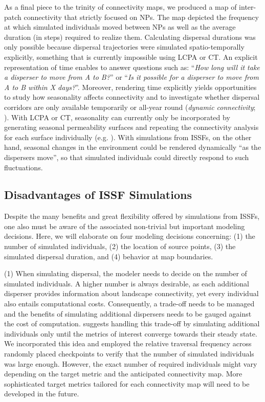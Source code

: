 \documentclass[abstract=on,10pt,a4paper,bibliography=totocnumbered]{article}
\begin{document}
As a final piece to the trinity of connectivity maps, we produced a map of
inter-patch connectivity that strictly focused on NPs. The map depicted the
frequency at which simulated individuals moved between NPs as well as the
average duration (in steps) required to realize them. Calculating dispersal
durations was only possible because dispersal trajectories were simulated
spatio-temporally explicitly, something that is currently impossible using LCPA
or CT. An explicit representation of time enables to answer questions such as:
``\textit{How long will it take a disperser to move from A to B?}'' or
``\textit{Is it possible for a disperser to move from A to B within X days?}''.
Moreover, rendering time explicitly yields opportunities to study how
seasonality affects connectivity and to investigate whether dispersal corridors
are only available temporarily or all-year round (\textit{dynamic connectivity};
\citealp{Zeller.2020}). With LCPA or CT, seasonality can currently only be
incorporated by generating seasonal permeability surfaces and repeating the
connectivity analysis for each surface individually (e.g. \citealp{Benz.2016,
Osipova.2019}). With simulations from ISSFs, on the other hand, seasonal changes
in the environment could be rendered dynamically ``as the dispersers move'', so
that simulated individuals could directly respond to such fluctuations.

\subsection{Disadvantages of ISSF Simulations}
Despite the many benefits and great flexibility offered by simulations from
ISSFs, one also must be aware of the associated non-trivial but important
modeling decisions. Here, we will elaborate on four modeling decisions
concerning: (1) the number of simulated individuals, (2) the location of source
points, (3) the simulated dispersal duration, and (4) behavior at map
boundaries.

(1) When simulating dispersal, the modeler needs to decide on the number of
simulated individuals. A higher number is always desirable, as each additional
disperser provides information about landscape connectivity, yet every
individual also entails computational costs. Consequently, a trade-off needs to
be managed and the benefits of simulating additional dispersers needs to be
gauged against the cost of computation. \cite{Signer.2017} suggests handling
this trade-off by simulating additional individuals only until the metrics of
interest converge towards their steady state. We incorporated this idea and
employed the relative traversal frequency across randomly placed checkpoints to
verify that the number of simulated individuals was large enough. However, the
exact number of required individuals might vary depending on the target metric
and the anticipated connectivity map. More sophisticated target metrics tailored
for each connectivity map will need to be developed in the future.
\end{document}
